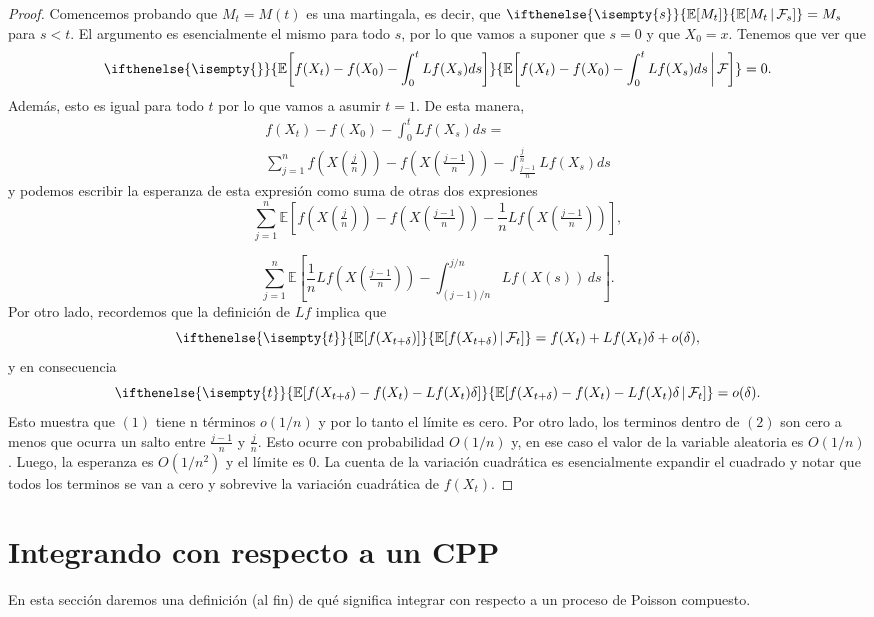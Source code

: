 \documentclass[
marginals=nomargin
]{kaohandt}
\newcommand{\mean}[2][]{%
	\ifthenelse{\isempty{#1}}%
	{\mathbb{E}\!\left[#2\right]}%
	{\mathbb{E}\!\left[#2\,\middle|\,\mathcal{F}_{#1}\right]}%
}
\begin{document}
	\begin{proof}
		Comencemos probando que $M_t = M(t)$ es una martingala, es decir, que $\mean[s]{M_t} = M_s$ para $s < t.$ El argumento es esencialmente el mismo para todo $s$, por lo que vamos a suponer que $s = 0$ y que $X_0 = x.$ Tenemos que ver que 
		$$\mean{f(X_t) - f(X_0) - \int_{0}^{t} Lf(X_s)ds} = 0.$$
		Además, esto es igual para todo $t$ por lo que vamos a asumir $t=1.$ De esta manera,
		\[
		\begin{aligned}
			f(X_t) - f(X_0) - \int_{0}^{t} Lf(X_s)ds = \\
			\sum_{j=1}^{n}{f(X(\frac{j}{n})) - f(X(\frac{j-1}{n})) - \int_{\frac{j-1}{n}}^{\frac{j}{n}} Lf(X_s)ds}
		\end{aligned}
		\]
		y podemos escribir la esperanza de esta expresión como suma de otras dos expresiones
		\begin{equation}
			\sum_{j=1}^{n} \mathbb{E}\left[ f\left(X\left(\tfrac{j}{n}\right)\right) - f\left(X\left(\tfrac{j-1}{n}\right)\right) - \frac{1}{n} Lf\left(X\left(\tfrac{j-1}{n}\right)\right) \right],
			\tag{1}
		\end{equation}
		
		\begin{equation}
			\sum_{j=1}^{n} \mathbb{E}\left[ \frac{1}{n} Lf\left(X\left(\tfrac{j-1}{n}\right)\right) - \int_{(j-1)/n}^{j/n} Lf(X(s))\, ds \right].
			\tag{2}
		\end{equation}
		Por otro lado, recordemos que la definición de $Lf$ implica que
		$$\mean[t]{f(X_{t + \delta})} = f(X_t) + Lf(X_t)\delta + o(\delta),$$
		y en consecuencia
		$$\mean[t]{f(X_{t + \delta}) - f(X_t) - Lf(X_t)\delta } = o(\delta).$$
		Esto muestra que $(1)$ tiene n términos $o(1/n)$ y por lo tanto el límite es cero. Por otro lado, los terminos dentro de $(2)$ son cero a menos que ocurra un salto entre $\frac{j-1}{n}$ y $\frac{j}{n}.$ Esto ocurre con probabilidad $O(1/n)$ y, en ese caso el valor de la variable aleatoria es $O(1/n)$. Luego, la esperanza es $O(1/n^2)$ y el límite es 0. La cuenta de la variación cuadrática es esencialmente expandir el cuadrado y notar que todos los terminos se van a cero y sobrevive la variación cuadrática de $f(X_t).$
	\end{proof}
	
	\section{Integrando con respecto a un CPP}
	
	En esta sección daremos una definición (al fin) de qué significa integrar con respecto a un proceso de Poisson compuesto.
	
\end{document}
